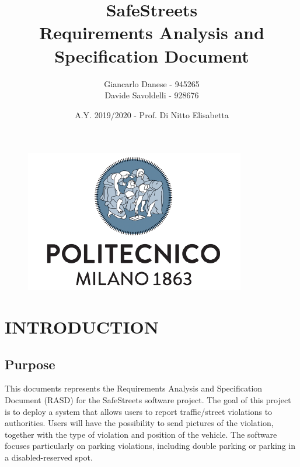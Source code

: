 \documentclass[12pt,a4paper]{article}
\author{Giancarlo Danese - 945265 \\
Davide Savoldelli - 928676}
\date{A.Y. 2019/2020 - Prof. Di Nitto Elisabetta}
\title{
 \textbf{\Huge{SafeStreets}} \\
 \large Requirements Analysis and Specification Document
}
\begin{document}
 \begin{figure}
  \centering
  \includegraphics[width=1.0\linewidth]{../assets/images/logo_poli.pdf}
 \end{figure}

 \maketitle
 \newpage
 \tableofcontents
 \newpage

\section{INTRODUCTION}
\subsection{Purpose} 
This documents represents the Requirements Analysis and Specification Document (RASD) for the SafeStreets software project.
The goal of this project is to deploy a system that allows users to report traffic/street violations to authorities. \newline
Users will have the possibility to send pictures of the violation, together with the type of violation and position of the vehicle. The software focuses particularly on parking violations, including double parking or parking in a disabled-reserved spot.
\end{document}
